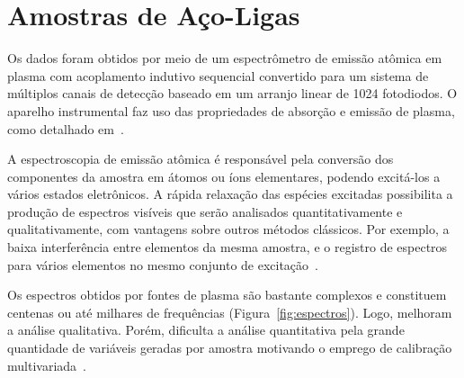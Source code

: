 \section{Amostras de Aço-Ligas}
\label{sec:amoacolig}
Os dados foram obtidos por meio de um espectrômetro de emissão atômica em plasma com acoplamento indutivo sequencial convertido para um sistema de múltiplos canais de detecção baseado em um arranjo linear de 1024 fotodiodos. O aparelho instrumental faz uso das propriedades de absorção e emissão de plasma, como detalhado em~\cite{PIMENTEL:1998}.

A espectroscopia de emissão atômica é responsável pela conversão dos componentes da amostra em átomos ou íons elementares, podendo excitá-los a vários estados eletrônicos. A rápida relaxação das espécies excitadas possibilita a produção de espectros visíveis que serão analisados quantitativamente e qualitativamente, com vantagens sobre outros métodos clássicos. Por exemplo, a baixa interferência entre elementos da mesma amostra, e o registro de espectros para vários elementos no mesmo conjunto de excitação~\cite{SKOOG:1997}.

Os espectros obtidos por fontes de plasma são bastante complexos e constituem centenas ou até milhares de frequências (Figura~\ref{fig:espectros}). Logo, melhoram a análise qualitativa. Porém, dificulta a análise quantitativa pela grande quantidade de variáveis geradas por amostra motivando o emprego de calibração multivariada~\cite{KRAMER:1998,MARTENS:1989}.

